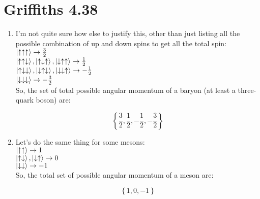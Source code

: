\documentclass[12pt]{article}
\begin{document}
\section*{Griffiths 4.38}
\begin{enumerate}[label=\alph*)]
\item I'm not quite sure how else to justify this, other than just listing all the possible combination of up and down spins to get all the total spin:\vspace{0.5em}\\
$\ket{\uparrow\uparrow\uparrow} \rightarrow \frac{3}{2}$\vspace{0.5em}\\
$\ket{\uparrow\uparrow\downarrow}, \ket{\uparrow\downarrow\uparrow}, \ket{\downarrow\uparrow\uparrow} \rightarrow \frac{1}{2}$\vspace{0.5em}\\
$\ket{\uparrow\downarrow\downarrow}, \ket{\downarrow\uparrow\downarrow}, \ket{\downarrow\downarrow\uparrow} \rightarrow -\frac{1}{2}$\vspace{0.5em}\\
$\ket{\downarrow\downarrow\downarrow} \rightarrow -\frac{3}{2}$\vspace{0.5em}\\
So, the set of total possible angular momentum of a baryon (at least a three-quark boson) are:

\[\boxed{\left\{\frac{3}{2}, \frac{1}{2}, -\frac{1}{2}, -\frac{3}{2}\right\}}\]

\item Let's do the same thing for some mesons:\vspace{0.5em}\\
$\ket{\uparrow\uparrow} \rightarrow 1$\vspace{0.5em}\\
$\ket{\uparrow \downarrow}, \ket{\downarrow\uparrow} \rightarrow 0$\vspace{0.5em}\\
$\ket{\downarrow\downarrow} \rightarrow -1$\vspace{0.5em}\\
So, the total set of possible angular momentum of a meson are:

\[\boxed{\left\{1, 0, -1\right\}}\]

\end{enumerate}
\newpage
\end{document}

